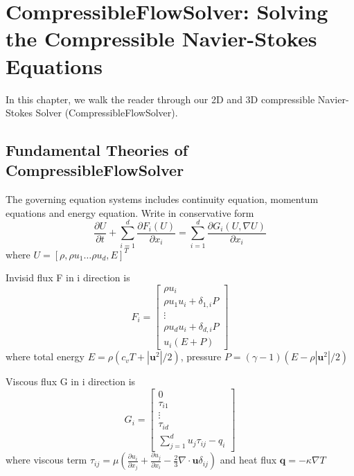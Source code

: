 \chapter{CompressibleFlowSolver: Solving the Compressible Navier-Stokes Equations}

In this chapter, we walk the reader through our 2D and 3D compressible Navier-Stokes Solver (CompressibleFlowSolver). 
\section{Fundamental Theories of CompressibleFlowSolver}
The governing equation systems includes continuity equation, momentum equations and energy equation. Write in conservative form 
\begin{equation}\label{eq1}
  \frac{\partial U}{\partial t}+
  \sum\limits_{i=1}^{d}{\frac{\partial F_{i}(U)}{\partial x_{i}}}
  =\sum\limits_{i=1}^{d}{\frac{\partial G_{i}(U,\nabla U)}{\partial x_{i}}}
\end{equation}
where $U=[\rho,\rho u_{1} \hdots \rho u_{d},E]^{T}$

Invisid flux F in i direction is
\begin{equation}
  F_{i}=
\begin{bmatrix}
  \rho u_{i}\\
  \rho u_{1}u_{i}+\delta_{1,i}P\\
  \vdots\\
  \rho u_{d}u_{i}+\delta_{d,i}P\\
  u_{i}(E+P)
\end{bmatrix}
\end{equation}
where total energy $E=\rho (c_{v}T+|\textbf{u}^{2}|/2)$, pressure $P=(\gamma-1)(E-\rho |\textbf{u}^{2}|/2)$

Viscous flux G in i direction is
\begin{equation}
  G_{i}=
\begin{bmatrix}
  0\\
  \tau_{i1}\\
  \vdots\\
  \tau_{id}\\
  \sum\limits_{j=1}^{d}{u_{j}\tau_{ij}}-q_{i}
\end{bmatrix}
\end{equation}
where viscous term $\tau_{ij}=\mu(\frac{\partial u_{i}}{\partial x_{j}}+\frac{\partial u_{j}}{\partial x_{i}}-\frac{2}{3}\nabla \cdot\textbf{u}\delta_{ij})$ and heat flux $\textbf{q}=-\kappa \nabla T$

